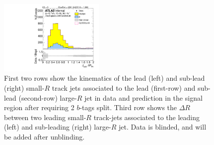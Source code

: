 \begin{figure}[htbp!]
\begin{center}
\includegraphics[angle=270, width=0.45\textwidth]{./figures/boosted/Signal/b77_TwoTag_split_Signal_sublHCand_trk_dr_blind.pdf}
  \caption{First two rows show the kinematics of the lead (left) and sub-lead (right) small-$R$ track jets associated to the lead (first-row) and sub-lead (second-row) large-$R$ jet in data and prediction in the signal region after requiring 2 $b$-tags split. Third row shows the $\Delta R$ between two leading small-$R$ track-jets associated to the leading (left) and sub-leading (right) large-$R$ jet. Data is blinded, and will be added after unblinding. }
  \label{fig:boosted-2bs-signal-blind-ak2}
\end{center}
\end{figure}


